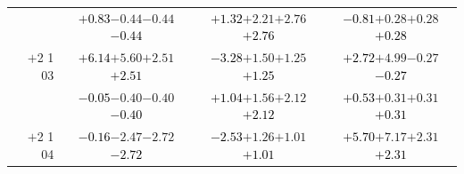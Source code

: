 \documentclass[compress]{beamer}
\begin{document}
\begin{frame}
\begin{tabular}{r | c | c | c}
          & \textcolor{black}{$+0.83$}\hspace{0.1 cm}$-0.44$\hspace{0.1 cm}$-0.44$\hspace{0.1 cm}\textcolor{black}{$-0.44$} & \textcolor{black}{$+1.32$}\hspace{0.1 cm}$+2.21$\hspace{0.1 cm}$+2.76$\hspace{0.1 cm}\textcolor{black}{$+2.76$} & \textcolor{black}{$-0.81$}\hspace{0.1 cm}$+0.28$\hspace{0.1 cm}$+0.28$\hspace{0.1 cm}\textcolor{black}{$+0.28$} \\
$+$2 1 03 & \textcolor{black}{$+6.14$}\hspace{0.1 cm}$+5.60$\hspace{0.1 cm}$+2.51$\hspace{0.1 cm}\textcolor{black}{$+2.51$} & \textcolor{black}{$-3.28$}\hspace{0.1 cm}$+1.50$\hspace{0.1 cm}$+1.25$\hspace{0.1 cm}\textcolor{black}{$+1.25$} & \textcolor{black}{$+2.72$}\hspace{0.1 cm}$+4.99$\hspace{0.1 cm}$-0.27$\hspace{0.1 cm}\textcolor{black}{$-0.27$} \\
          & \textcolor{black}{$-0.05$}\hspace{0.1 cm}$-0.40$\hspace{0.1 cm}$-0.40$\hspace{0.1 cm}\textcolor{black}{$-0.40$} & \textcolor{black}{$+1.04$}\hspace{0.1 cm}$+1.56$\hspace{0.1 cm}$+2.12$\hspace{0.1 cm}\textcolor{black}{$+2.12$} & \textcolor{black}{$+0.53$}\hspace{0.1 cm}$+0.31$\hspace{0.1 cm}$+0.31$\hspace{0.1 cm}\textcolor{black}{$+0.31$} \\
$+$2 1 04 & \textcolor{black}{$-0.16$}\hspace{0.1 cm}$-2.47$\hspace{0.1 cm}$-2.72$\hspace{0.1 cm}\textcolor{black}{$-2.72$} & \textcolor{black}{$-2.53$}\hspace{0.1 cm}$+1.26$\hspace{0.1 cm}$+1.01$\hspace{0.1 cm}\textcolor{black}{$+1.01$} & \textcolor{black}{$+5.70$}\hspace{0.1 cm}$+7.17$\hspace{0.1 cm}$+2.31$\hspace{0.1 cm}\textcolor{black}{$+2.31$} \\

\end{tabular}
\end{frame}
\end{document}
